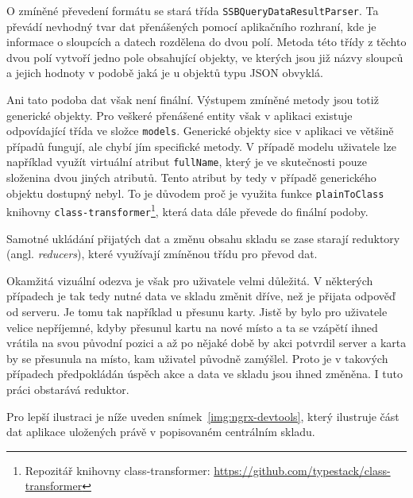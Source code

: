 O zmíněné převedení formátu se stará třída \texttt{SSBQueryDataResultParser}. Ta převádí nevhodný tvar dat přenášených pomocí aplikačního rozhraní, kde je informace o sloupcích a datech rozdělena do dvou polí. Metoda této třídy z těchto dvou polí vytvoří jedno pole obsahující objekty, ve kterých jsou již názvy sloupců a jejich hodnoty v podobě jaká je u objektů typu JSON obvyklá.

Ani tato podoba dat však není finální. Výstupem zmíněné metody jsou totiž generické objekty. Pro veškeré přenášené entity však v aplikaci existuje odpovídající třída ve složce \texttt{models}. Generické objekty sice v aplikaci ve většině případů fungují, ale chybí jím specifické metody. V případě modelu uživatele lze například využít virtuální atribut \texttt{fullName}, který je ve skutečnosti pouze složenina dvou jiných atributů. Tento atribut by tedy v případě generického objektu dostupný nebyl. 
To je důvodem proč je využita funkce \texttt{plainToClass} knihovny \texttt{class-transformer}\footnote{Repozitář knihovny class-transformer: \url{https://github.com/typestack/class-transformer}}, která data dále převede do finální podoby.

Samotné ukládání přijatých dat a změnu obsahu skladu se zase starají reduktory (angl. \emph{reducers}), které využívají zmíněnou třídu pro převod dat. 

Okamžitá vizuální odezva je však pro uživatele velmi důležitá. V některých případech je tak tedy nutné data ve skladu změnit dříve, než je přijata odpověď od serveru. Je tomu tak například u přesunu karty. Jistě by bylo pro uživatele velice nepříjemné, kdyby přesunul kartu na nové místo a ta se vzápětí ihned vrátila na svou původní pozici a až po nějaké době by akci potvrdil server a karta by se přesunula na místo, kam uživatel původně zamýšlel. Proto je v takových případech předpokládán úspěch akce a data ve skladu jsou ihned změněna. I tuto práci obstarává reduktor.

Pro lepší ilustraci je níže uveden snímek~\ref{img:ngrx-devtools}, který ilustruje část dat aplikace uložených právě v popisovaném centrálním skladu.

